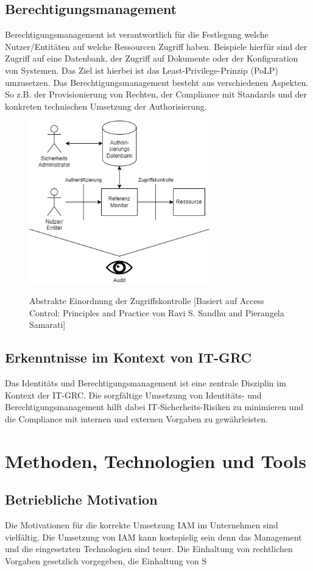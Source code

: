 \documentclass[10pt]{article}
\begin{document}
\subsection{Berechtigungsmanagement}
Berechtigungsmanagement ist verantwortlich für die Festlegung welche Nutzer/Entitäten auf welche Ressourcen Zugriff haben. Beispiele hierfür sind der Zugriff auf eine Datenbank, der Zugriff auf Dokumente oder der Konfiguration von Systemen. Das Ziel ist hierbei ist das Least-Privilege-Prinzip (PoLP) umzusetzen. Das Berechtigungsmanagement besteht aus verschiedenen Aspekten. So z.B. der Provisionierung von Rechten, der Compliance mit Standards und der konkreten technischen Umsetzung der Authorisierung.
\begin{figure}
  \centering
  \includegraphics[width=0.7\textwidth]{assets/accessmanagement.png}
  \label{fig:accesscontrol}
  \caption{Abstrakte Einordnung der Zugriffskontrolle [Basiert auf Access Control: Principles and Practice von Ravi S. Sandhu and Pierangela Samarati]}
\end{figure}
\subsection{Erkenntnisse im Kontext von IT-GRC}
Das Identitäts und Berechtigungsmanagement ist eine zentrale Disziplin im Kontext der IT-GRC. Die sorgfältige Umsetzung von Identitäts- und Berechtigungsmanagement hilft dabei IT-Sicherheits-Risiken zu minimieren und die Compliance mit internen und externen Vorgaben zu gewährleisten.
\section{Methoden, Technologien und Tools}
\label{sec:existing}
\subsection{Betriebliche Motivation}
Die Motivationen für die korrekte Umsetzung IAM im Unternehmen sind vielfältig. Die Umsetzung von IAM kann kostspielig sein denn das Management und die eingesetzten Technologien sind teuer. Die Einhaltung von rechtlichen Vorgaben gesetzlich vorgegeben, die Einhaltung von S
\end{document}
